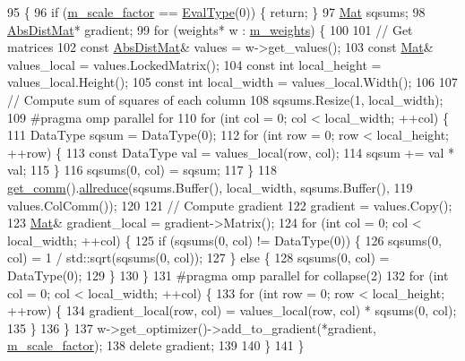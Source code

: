\begin{DoxyCode}
95                                                                       \{
96   \textcolor{keywordflow}{if} (\hyperlink{classlbann_1_1objective__function__term_a59a544b8ff0455ed5091de3bf0d81c3c}{m\_scale\_factor} == \hyperlink{base_8hpp_a3266f5ac18504bbadea983c109566867}{EvalType}(0)) \{ \textcolor{keywordflow}{return}; \}
97   \hyperlink{base_8hpp_a68f11fdc31b62516cb310831bbe54d73}{Mat} sqsums;
98   \hyperlink{base_8hpp_a9a697a504ae84010e7439ffec862b470}{AbsDistMat}* gradient;
99   \textcolor{keywordflow}{for} (weights* w : \hyperlink{classlbann_1_1objective__function__term_a1d601c29153ae9cb54c585887608f2bf}{m\_weights}) \{
100 
101     \textcolor{comment}{// Get matrices}
102     \textcolor{keyword}{const} \hyperlink{base_8hpp_a9a697a504ae84010e7439ffec862b470}{AbsDistMat}& values = w->get\_values();
103     \textcolor{keyword}{const} \hyperlink{base_8hpp_a68f11fdc31b62516cb310831bbe54d73}{Mat}& values\_local = values.LockedMatrix();
104     \textcolor{keyword}{const} \textcolor{keywordtype}{int} local\_height = values\_local.Height();
105     \textcolor{keyword}{const} \textcolor{keywordtype}{int} local\_width = values\_local.Width();
106 
107     \textcolor{comment}{// Compute sum of squares of each column}
108     sqsums.Resize(1, local\_width);
109 \textcolor{preprocessor}{    #pragma omp parallel for}
110     \textcolor{keywordflow}{for} (\textcolor{keywordtype}{int} col = 0; col < local\_width; ++col) \{
111       DataType sqsum = DataType(0);
112       \textcolor{keywordflow}{for} (\textcolor{keywordtype}{int} row = 0; row < local\_height; ++row) \{
113         \textcolor{keyword}{const} DataType val = values\_local(row, col);
114         sqsum += val * val;
115       \}
116       sqsums(0, col) = sqsum;
117     \}
118     \hyperlink{classlbann_1_1objective__function__term_a5f89b676a26a6b76ddc26563ac87beb9}{get\_comm}().\hyperlink{classlbann_1_1lbann__comm_af5631e5f0f54e4df4958eba9df2599ef}{allreduce}(sqsums.Buffer(), local\_width, sqsums.Buffer(),
119                          values.ColComm());
120 
121     \textcolor{comment}{// Compute gradient}
122     gradient = values.Copy();
123     \hyperlink{base_8hpp_a68f11fdc31b62516cb310831bbe54d73}{Mat}& gradient\_local = gradient->Matrix();
124     \textcolor{keywordflow}{for} (\textcolor{keywordtype}{int} col = 0; col < local\_width; ++col) \{
125       \textcolor{keywordflow}{if} (sqsums(0, col) != DataType(0)) \{
126         sqsums(0, col) = 1 / std::sqrt(sqsums(0, col));
127       \} \textcolor{keywordflow}{else} \{
128         sqsums(0, col) = DataType(0);
129       \}
130     \}
131 \textcolor{preprocessor}{    #pragma omp parallel for collapse(2)}
132     \textcolor{keywordflow}{for} (\textcolor{keywordtype}{int} col = 0; col < local\_width; ++col) \{
133       \textcolor{keywordflow}{for} (\textcolor{keywordtype}{int} row = 0; row < local\_height; ++row) \{
134         gradient\_local(row, col) = values\_local(row, col) * sqsums(0, col);
135       \}
136     \}
137     w->get\_optimizer()->add\_to\_gradient(*gradient, \hyperlink{classlbann_1_1objective__function__term_a59a544b8ff0455ed5091de3bf0d81c3c}{m\_scale\_factor});
138     \textcolor{keyword}{delete} gradient;
139 
140   \}
141 \}
\end{DoxyCode}
